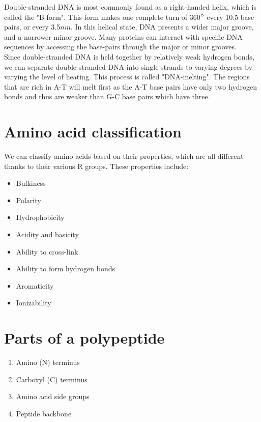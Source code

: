 \documentclass[11pt]{article}
\begin{document}
Double-stranded DNA is most commonly found as a right-handed helix, which is called the "B-form". This form makes one complete turn of 360\(\degree\) every 10.5 base pairs, or every 3.5\(\si{nm}\). In this helical state, DNA presents a wider major groove, and a narrower minor groove. Many proteins can interact with specific DNA sequences by accessing the base-pairs through the major or minor grooves.
\\[0pt]

Since double-stranded DNA is held together by relatively weak hydrogen bonds, we can separate double-stranded DNA into single strands to varying degrees by varying the level of heating. This process is called "DNA-melting". The regions that are rich in A-T will melt first as the A-T base pairs have only two hydrogen bonds and thus are weaker than G-C base pairs which have three.

\newpage

\section{Amino acid classification}
\label{sec:org70a3515}
We can classify amino acids based on their properties, which are all different thanks to their various R groups. These properties include:
\begin{itemize}
\item Bulkiness
\item Polarity
\item Hydrophobicity
\item Acidity and basicity
\item Ability to cross-link
\item Ability to form hydrogen bonds
\item Aromaticity
\item Ionizability
\end{itemize}

\section{Parts of a polypeptide}
\label{sec:orgd4de2de}
\begin{enumerate}
\item Amino (N) terminus
\item Carboxyl (C) terminus
\item Amino acid side groups
\item Peptide backbone
\end{enumerate}
\end{document}
